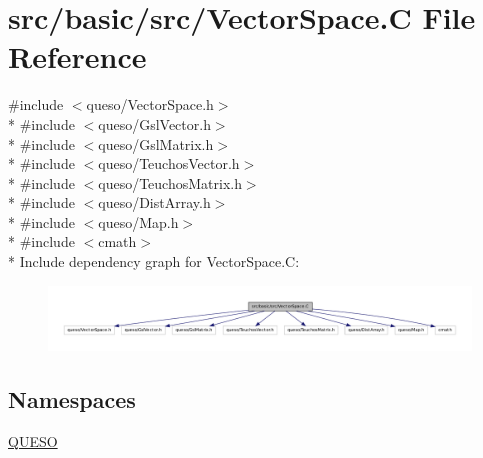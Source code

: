 \hypertarget{_vector_space_8_c}{\section{src/basic/src/\-Vector\-Space.C File Reference}
\label{_vector_space_8_c}
}
{\ttfamily \#include $<$queso/\-Vector\-Space.\-h$>$}\\*
{\ttfamily \#include $<$queso/\-Gsl\-Vector.\-h$>$}\\*
{\ttfamily \#include $<$queso/\-Gsl\-Matrix.\-h$>$}\\*
{\ttfamily \#include $<$queso/\-Teuchos\-Vector.\-h$>$}\\*
{\ttfamily \#include $<$queso/\-Teuchos\-Matrix.\-h$>$}\\*
{\ttfamily \#include $<$queso/\-Dist\-Array.\-h$>$}\\*
{\ttfamily \#include $<$queso/\-Map.\-h$>$}\\*
{\ttfamily \#include $<$cmath$>$}\\*
Include dependency graph for Vector\-Space.\-C\-:
\nopagebreak
\begin{figure}[H]
\begin{center}
\leavevmode
\includegraphics[width=350pt]{_vector_space_8_c__incl}
\end{center}
\end{figure}
\subsection*{Namespaces}
\begin{DoxyCompactItemize}
\item 
\hyperlink{namespace_q_u_e_s_o}{Q\-U\-E\-S\-O}
\end{DoxyCompactItemize}
